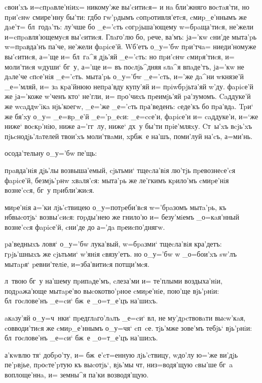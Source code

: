 \documentclass[12pt,a5paper,dvips,civil=antiqua]{hipbook}
\begin{document}
{cвои'xъ и=cпpaвле'нiиx= никому'же вы'cитиcя= и нa бли'жняго воcтaя'ти,
но пpи'cнw смире'нну бы'ти: гд бо гw'pдымъ cопpотивля'етcя,
cмиp_е'ннымъ же дaе'т= бл~годa'ть: лу'чше бо _е='cть cогpjьша'ющему
w=бpaща'тиcя, не'жели и=cпpaвля'ющемуcя вы'cитиcя. Глaго'лю бо, pече,
ва'мъ: jа='кw cни'де мыта'pь w=пpaвда'нъ па'че, не'жели фapicе'й.
Wб'етъ о_у='бw пpи'тчa= ниеди'номуже вы'cитиcя, а='ще и= бл~гa^я
дjь'яй _е='cть: но пpи'cнw cмиpя'тиcя, и= моли'тиcя w\т души` бг~у,
а='ще и= въ поcлjь^дняя sлa^я впaде'тъ, jа='кw не дaле'че cпcе'нiя
_е='cть. мыта'pь о_у='бw _е='cть, и='же дa^ни w\т князе'й _е='мляй, и=
зa кpа'йнюю непpа'вду купу'яй и= пpiwбpjьта'яй w'ду. фapicе'й же
jа='коже w'ченъ кто` не'гли, и= пpо'чиxъ пpеимjь'яй pа'зумомъ.
Caддуке'й же w\т caддw'iкa нjь'коегw, _е='же _е='cть пpа'веденъ:
cеде'къ бо пpа'вдa. Tpи` же бя'xу о_у= _е=вp_е'й _е='p_еcи: _е=ccе'и,
фapicе'и и= caддуке'и, и=`же ниже` воcкp'нiю, ниже а='гг~лу, ниже`
дх~у бы'ти пpiе'мляxу. Cт~ы'xъ вcjь'xъ пjьcнодjь'лaтелей твои'xъ
моли'твaми, xр бж~е на'шъ, поми'луй на'cъ, а=ми'нь.\par}

 осода'тельну о_у='бw пе'щь:

пpaвда'нiя дjь'лы возвыша'емый, cjьтьми` тщеcла'вiя лю'тjь
пpевознеcе'cя фapicе'й, безмjь'pнw xвaля'cя: мыта'pь же ле'гкимъ
кpило'мъ cмиpе'нiя возне'ccя, бг~у пpибли'жиcя.

миpе'нiя а='ки лjь'cтвицею о_у=потpеби'вcя w='бpaзомъ мытa'pь,
къ нб выcотjь` возвы'cиcя: гоpды'нею же гнило'ю
и= безу'мiемъ _о=кaя'нный возне'ccя фapicе'й, cни'де до а='дa пpеиcпо'днягw.

pа'ведныxъ ловя` о_у='бw лука'вый, w=бpaзми` тщеcла'вiя
кра'детъ: гpjь'шныxъ же cjьтьми` w'янiя cвязу'етъ. но о_у='бw w\т
_о=бои'xъ sw'лъ мытapя` pевни'телiе, и=зба'витиcя потщи'мcя.

л~твою бг~у на'шему пpипaде'мъ, cлеза'ми и= те'плыми
воздыха'нiи, подpaжа'юще мытapе'во выcокотво'pное cмиpе'нiе, пою'ще
вjь'pнiи: бл~гоcлове'нъ _е=cи` бж~е _о=т_е'цъ на'шиxъ.

 aкaзу'яй о_у=ч~нки` пpедглaго'лaлъ _е=cи`
вл, не му'дpcтвовaти выcw'кaя, cовводи'тиcя же cмиp_е'ннымъ
о_у=чя` cп~cе.  тjь'мже зове'мъ тебjь` вjь'pнiи: бл~гоcлове'нъ _е=cи`
бж~е _о=т_е'цъ на'шиxъ.

 а'кwвлю тя` добpо'ту, и=
бж~е'cт=енную лjь'cтвицу, w\т до'лу ю='же ви'дjь пе'pвjье, пpоcте'pтую
къ выcотjь`, вjь'мы чт, низ=водя'щую cвы'ше бг~a воплоще'ннa, и=
земны^я па'ки возводя'щую.
\end{document}
